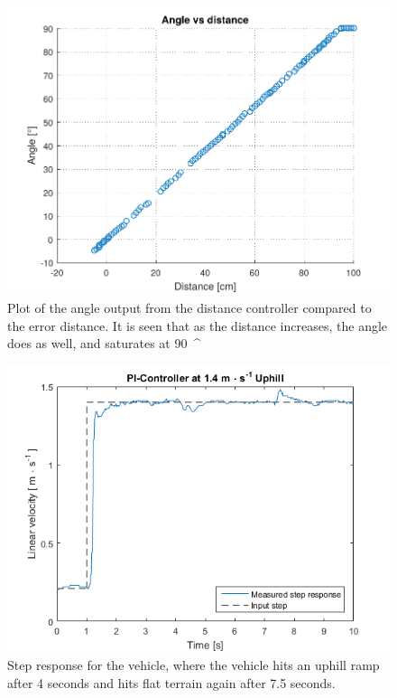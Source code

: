 \begin{figure}[H]
  \centering
	\includegraphics[scale=0.8]{figures/AccTest7.pdf}
	\caption{Plot of the angle output from the distance controller compared to the error distance. It is seen that as the distance increases, the angle does as well, and saturates at \SI{90}{^\circ}}
	\label{AccT7fig}
\end{figure}

\begin{figure}[H]
  \centering
	\includegraphics[scale=0.8]{figures/AccTest8U.png}
	\caption{Step response for the vehicle, where the vehicle hits an uphill ramp after 4 seconds and hits flat terrain again after \SI{7,5}{} seconds.}
	\label{AccT8Ufig}
\end{figure}


